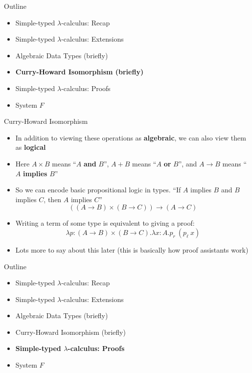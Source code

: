 \documentclass[leqno,presentation,usenames,dvipsnames]{beamer}
\begin{document}
\begin{frame}{Outline}
    \begin{itemize}
        \item Simple-typed $\lambda$-calculus: Recap
        \item Simple-typed $\lambda$-calculus: Extensions
        \item Algebraic Data Types (briefly)
        \item \textbf{Curry-Howard Isomorphism (briefly)}
        \item Simple-typed $\lambda$-calculus: Proofs
        \item System $F$
    \end{itemize}
\end{frame}

\begin{frame}[fragile]{Curry-Howard Isomorphism}
    \begin{itemize}
        \item In addition to viewing these operations as \textbf{algebraic}, we can also view them as \textbf{logical}
        \item Here $A \times B$ means ``$A$ \textbf{and} $B$'', $A + B$ means ``$A$ \textbf{or} $B$'', and $A \to B$ means ``$A$ \textbf{implies} $B$''
        \item So we can encode basic propositional logic in types.
            ``If $A$ implies $B$ and $B$ implies $C$, then $A$ implies $C$''
            \[
                ((A \to B) \times (B \to C)) \to (A \to C)
            \]
        \item Writing a term of some type is equivalent to giving a proof:
            \[
                \lambda p : (A \to B) \times (B \to C). \lambda x : A. p_r~(p_\ell~x)
            \]
        \item Lots more to say about this later (this is basically how proof assistants work)
    \end{itemize}
\end{frame}

\begin{frame}{Outline}
    \begin{itemize}
        \item Simple-typed $\lambda$-calculus: Recap
        \item Simple-typed $\lambda$-calculus: Extensions
        \item Algebraic Data Types (briefly)
        \item Curry-Howard Isomorphism (briefly)
        \item \textbf{Simple-typed $\lambda$-calculus: Proofs}
        \item System $F$
    \end{itemize}
\end{frame}
\end{document}
